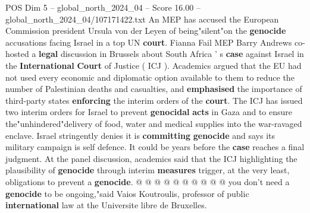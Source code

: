 \begin{textsample}{POS Dim 5 – global\_north\_2024\_04 – Score 16.00 – global\_north\_2024\_04/107171422.txt}  \label{ex:f5_pos_283}
An MEP has accused the European Commission president Ursula von der Leyen of being"silent"on the \textbf{genocide} accusations facing Israel in a top UN \textbf{court}.
Fianna Fail MEP Barry Andrews co-hosted a \textbf{legal} discussion in Brussels about South Africa ' s \textbf{case} against Israel in the \textbf{International} \textbf{Court} of Justice ( ICJ ).
Academics argued that the EU had not used every economic and diplomatic option available to them to reduce the number of Palestinian deaths and casualties, and \textbf{emphasised} the importance of third-party states \textbf{enforcing} the interim orders of the \textbf{court}.
The ICJ has issued two interim orders for Israel to prevent \textbf{genocidal} \textbf{acts} in Gaza and to ensure the"unhindered"delivery of food, water and medical supplies into the war-ravaged enclave.
Israel stringently denies it is \textbf{committing} \textbf{genocide} and says its military campaign is self defence.
It could be years before the \textbf{case} reaches a final judgment.
At the panel discussion, academics said that the ICJ highlighting the plausibility of \textbf{genocide} through interim \textbf{measures} trigger, at the very least, obligations to prevent a \textbf{genocide}. @ @ @ @ @ @ @ @ @ @ you don't need a \textbf{genocide} to be ongoing,"said Vaios Koutroulis, professor of public \textbf{international} law at the Universite libre de Bruxelles.

\end{textsample}
